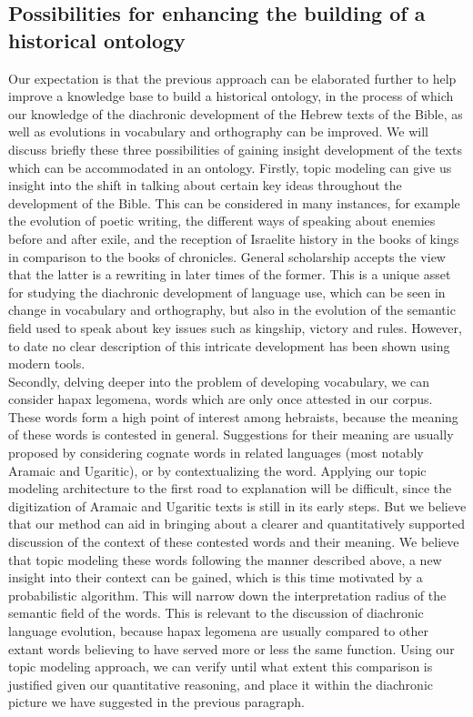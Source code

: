 \documentclass[10pt,a4paper]{article}
\begin{document}
\subsection{Possibilities for enhancing the building of a historical ontology}
Our expectation is that the previous approach can be elaborated further to help improve a knowledge base to build a historical ontology, in the process of  which our knowledge of the diachronic development of the Hebrew texts of the Bible, as well as evolutions in vocabulary and orthography can be improved. We will discuss briefly these three possibilities of gaining insight development of the texts which can be accommodated in an ontology.
Firstly, topic modeling can give us insight into the shift in talking about certain key ideas throughout the development of the Bible. This can be considered in many instances, for example the evolution of poetic writing, the different ways of speaking about enemies before and after exile, and the reception of Israelite history in the books of kings in comparison to the books of chronicles. General scholarship accepts the view that the latter is a rewriting in later times of the former. This is a unique asset for studying the diachronic development of language use, which can be seen in change in vocabulary and orthography, but also in the evolution of the semantic field used to speak about key issues such as kingship, victory and rules. However, to date no clear description of this intricate development has been shown using modern tools.  
\\Secondly, delving deeper into the problem of developing vocabulary, we can consider hapax legomena, words which are only once attested in our corpus. These words form a high point of interest among hebraists, because the meaning of these words is contested in general. Suggestions for their meaning are usually proposed by considering cognate words in related languages (most notably Aramaic and Ugaritic), or by contextualizing the word. Applying our topic modeling architecture to the first road to explanation will be difficult, since the digitization of Aramaic and Ugaritic texts is still in its early steps. But we believe that our method can aid in bringing about a clearer and quantitatively supported discussion of the context of these contested words and their meaning. We believe that topic modeling these words following the manner described above, a new insight into their context can be gained, which is this time motivated by a probabilistic algorithm. This will narrow down the interpretation radius of the semantic field of the words. This is relevant to the discussion of diachronic language evolution, because hapax legomena are usually compared to other extant words believing to have served more or less the same function. Using our topic modeling approach, we can verify until what extent this comparison is justified given our quantitative reasoning, and place it within the diachronic picture we have suggested in the previous paragraph.
\end{document}
